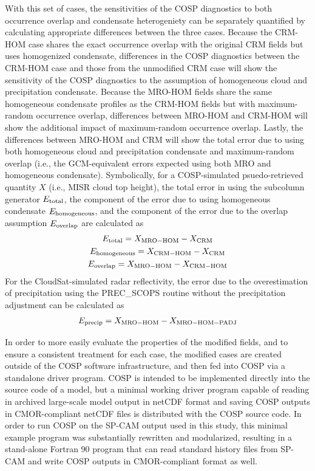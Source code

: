 With this set of cases, the sensitivities of the COSP diagnostics to both occurrence overlap and condensate heterogeniety can be separately quantified by calculating appropriate differences between the three cases. Because the CRM-HOM case shares the exact occurrence overlap with the original CRM fields but uses homogenized condensate, differences in the COSP diagnostics between the CRM-HOM case and those from the unmodified CRM case will show the sensitivity of the COSP diagnostics to the assumption of homogeneous cloud and precipitation condensate. Because the MRO-HOM fields share the same homogeneous condensate profiles as the CRM-HOM fields but with maximum-random occurrence overlap, differences between MRO-HOM and CRM-HOM will show the additional impact of maximum-random occurrence overlap. Lastly, the differences between MRO-HOM and CRM will show the total error due to using both homogeneous cloud and precipitation condensate and maximum-random overlap (i.e., the GCM-equivalent errors expected using both MRO and homogeneous condensate). Symbolically, for a COSP-simulated psuedo-retrieved quantity $X$ (i.e., MISR cloud top height), the total error in using the subcolumn generator $E_{\rm total}$, the component of the error due to using homogeneous condensate $E_{\rm homogeneous}$, and the component of the error due to the overlap assumption $E_{\rm overlap}$ are calculated as
\begin{gather}
    E_{\rm total} = X_{\rm MRO-HOM} - X_{\rm CRM} \\
    E_{\rm homogeneous} = X_{\rm CRM-HOM} - X_{\rm CRM} \\
    E_{\rm overlap} = X_{\rm MRO-HOM} - X_{\rm CRM-HOM}
\end{gather}
For the CloudSat-simulated radar reflectivity, the error due to the overestimation of precipitation using the PREC\_SCOPS routine without the precipitation adjustment can be calculated as
\begin{gather}
    E_{\rm precip} = X_{\rm MRO-HOM} - X_{\rm MRO-HOM-PADJ}
\end{gather}

In order to more easily evaluate the properties of the modified fields, and to ensure a consistent treatment for each case, the modified cases are created outside of the COSP software infrastructure, and then fed into COSP via a standalone driver program. COSP is intended to be implemented directly into the source code of a model, but a minimal working driver program capable of reading in archived large-scale model output in netCDF format and saving COSP outputs in CMOR-compliant netCDF files is distributed with the COSP source code. In order to run COSP on the SP-CAM output used in this study, this minimal example program was substantially rewritten and modularized, resulting in a stand-alone Fortran 90 program that can read standard history files from SP-CAM and write COSP outputs in CMOR-compliant format as well.

